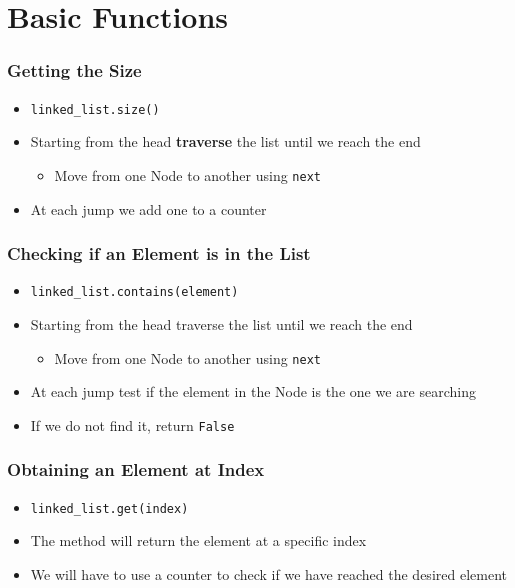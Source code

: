 \documentclass[11pt]{beamer}
\begin{document}
\section{Basic Functions}

	\begin{frame}[fragile]
		\frametitle{Getting the Size}
		\begin{itemize}
			\item \lstinline|linked_list.size()|
			\item Starting from the head \textbf{traverse} the list until we reach the end
			\begin{itemize}
				\item Move from one Node to another using \texttt{next}
			\end{itemize}
			\item At each jump we add one to a counter
		\end{itemize}
	\end{frame}

	\begin{frame}[fragile]
		\frametitle{Checking if an Element is in the List}
		\begin{itemize}
			\item \lstinline|linked_list.contains(element)|
			\item Starting from the head traverse the list until we reach the end
			\begin{itemize}
				\item Move from one Node to another using \texttt{next}
			\end{itemize}
			\item At each jump test if the element in the Node is the one we are searching
			\item If we do not find it, return \lstinline|False|
		\end{itemize}
	\end{frame}

	\begin{frame}[fragile]
		\frametitle{Obtaining an Element at Index}
		\begin{itemize}
			\item \lstinline|linked_list.get(index)|
			\item The method will return the element at a specific index
			\item We will have to use a counter to check if we have reached the desired element
		\end{itemize}
	\end{frame}
\end{document}
